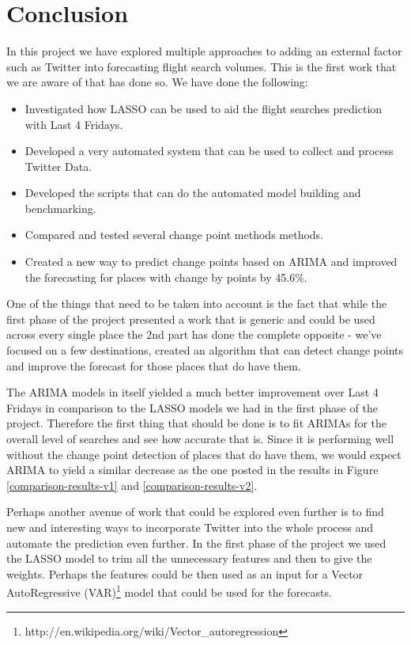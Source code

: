 \documentclass[minf,twoside,singlespacing,parskip,frontabs,notimes,12pt]{infthesis} %
\begin{document}
\section{Conclusion}

In this project we have explored multiple approaches to adding an external factor such as Twitter into forecasting flight search volumes. This is the first work that we are aware of that has done so. We have done the following:

\begin{itemize}
\item Investigated how LASSO can be used to aid the flight searches prediction with Last 4 Fridays.
\item Developed a very automated system that can be used to collect and process Twitter Data.
\item Developed the scripts that can do the automated model building and benchmarking. 
\item Compared and tested several change point methods methods.
\item Created a new way to predict change points based on ARIMA and improved the forecasting for places with change by points by 45.6\%.
\end{itemize}

One of the things that need to be taken into account is the fact that while the first phase of the project presented a work that is generic and could be used across every single place the 2nd part has done the complete opposite - we've focused on a few destinations, created an algorithm that can detect change points and improve the forecast for those places that do have them.

The ARIMA models in itself yielded a much better improvement over Last 4 Fridays in comparison to the LASSO models we had in the first phase of the project. Therefore the first thing that should be done is to fit ARIMAs for the overall level of searches and see how accurate that is. Since it is performing well without the change point detection of places that do have them, we would expect ARIMA to yield a similar decrease as the one posted in the results in Figure \ref{comparison-results-v1} and \ref{comparison-results-v2}. 


Perhaps another avenue of work that could be explored even further is to find new and interesting ways to incorporate Twitter into the whole process and automate the prediction even further. In the first phase of the project we used the LASSO model to trim all the unnecessary features and then to give the weights. Perhaps the features could be then used as an input for a Vector AutoRegressive (VAR)\footnote{http://en.wikipedia.org/wiki/Vector\_autoregression} model that could be used for the forecasts. 
\end{document}
